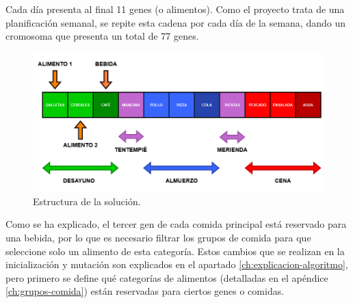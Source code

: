 Cada día presenta al final 11 genes (o alimentos). Como el proyecto trata de una planificación semanal, se repite esta cadena por cada día de la semana, dando un cromosoma que presenta un total de 77 genes.

\begin{figure}[H]
    \centering
    \includegraphics[width=1\textwidth]{figures/cromosoma_desarrollo.png}
    \caption{Estructura de la solución.}
    \label{fig:cromosoma_desarrollo}
\end{figure}

Como se ha explicado, el tercer gen de cada comida principal está reservado para una bebida, por lo que es necesario filtrar los grupos de comida para que seleccione solo un alimento de esta categoría. Estos cambios que se realizan en la inicialización y mutación son explicados en el apartado \ref{ch:explicacion-algoritmo}, pero primero se define qué categorías de alimentos (detalladas en el apéndice \ref{ch:grupos-comida}) están reservadas para ciertos genes o comidas.

